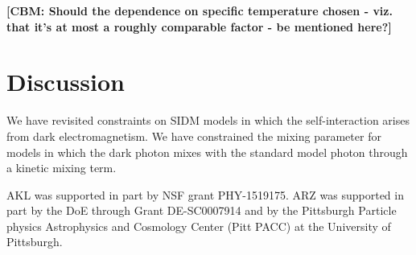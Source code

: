 \documentclass[nofootinbib,prd,superscriptaddress,twocolumn]{revtex4}
\newcommand{\cbm}[1]{{{\bf{\color{Green}[CBM: #1]}}}}
\begin{document}
\cbm{Should the dependence on specific temperature chosen - viz. that it's at most a roughly comparable factor - be mentioned here?}



\section{Discussion}
\label{section:conclusions}


We have revisited constraints on SIDM models in which the 
self-interaction arises from dark electromagnetism. We have 
constrained the mixing parameter for models in which the dark photon 
mixes with the standard model photon through a kinetic mixing term. 



\acknowledgments


AKL was supported in part by NSF grant PHY-1519175. 
ARZ was supported in part by the DoE through Grant DE-SC0007914 and by 
the Pittsburgh Particle physics Astrophysics and Cosmology Center (Pitt PACC) 
at the University of Pittsburgh.


\end{document}
